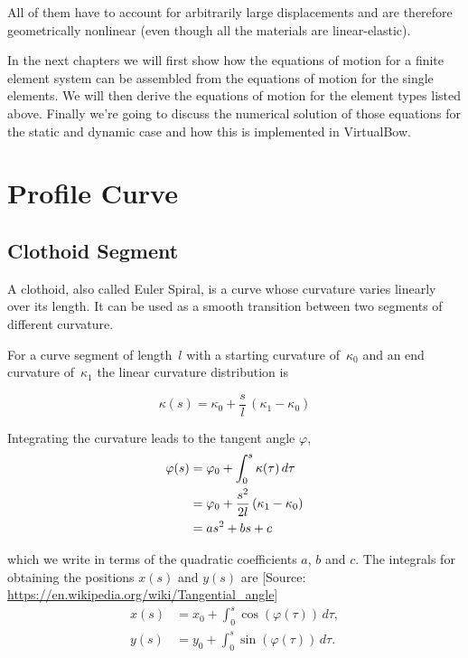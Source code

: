 All of them have to account for arbitrarily large displacements and are therefore geometrically nonlinear (even though all the materials are linear-elastic).

In the next chapters we will first show how the equations of motion for a finite element system can be assembled from the equations of motion for the single elements. We will then derive the equations of motion for the element types listed above. Finally we're going to discuss the numerical solution of those equations for the static and dynamic case and how this is implemented in VirtualBow.

\section{Profile Curve}

\subsection*{Clothoid Segment}

A clothoid, also called Euler Spiral, is a curve whose curvature varies linearly over its length.
It can be used as a smooth transition between two segments of different curvature.

For a curve segment of length~$l$ with a starting curvature of~$\kappa_0$ and an end curvature of~$\kappa_1$ the linear curvature distribution is

\begin{equation}
\kappa(s) = \kappa_0 + \frac{s}{l}\,(\kappa_1 - \kappa_0)
\end{equation}

Integrating the curvature leads to the tangent angle $\varphi$,
%
\begin{align}
\varphi(s) &= \varphi_0 + \int_{0}^{s} \kappa(\tau)\,d\tau \notag \\
&= \varphi_0 + \frac{s^2}{2l}\,(\kappa_1 - \kappa_0) \notag \\
&= as^2 + bs + c
\end{align}

which we write in terms of the quadratic coefficients $a$, $b$ and $c$.
The integrals for obtaining the positions $x(s)$ and $y(s)$ are [Source: \url{https://en.wikipedia.org/wiki/Tangential_angle}]
%
\begin{align}
x(s) &= x_0 + \int_{0}^{s} \cos(\varphi(\tau))\,d\tau, \\
y(s) &= y_0 + \int_{0}^{s} \sin(\varphi(\tau))\,d\tau.
\end{align}

